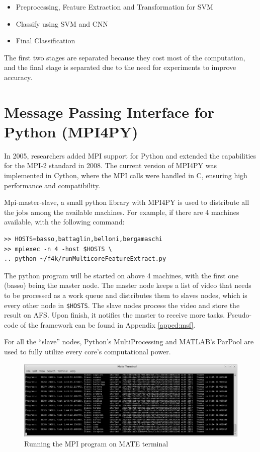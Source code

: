 \documentclass[bsc,frontabs,twoside,fullspacing,parskip,deptreport]{infthesis}
\begin{document}
\begin{itemize}
   \setlength{\parskip}{0pt}
   \item Preprocessing, Feature Extraction and Transformation for SVM
   \item Classify using SVM and CNN
   \item Final Classification
\end{itemize}
The first two stages are separated because they cost most of the computation, and the final stage is separated due to the need for experiments to improve accuracy.

\section{Message Passing Interface for Python (MPI4PY)}

In 2005, researchers added MPI support for Python\cite{MPI4PY} and extended the capabilities for the MPI-2 standard in 2008\cite{MPI4PY2}. The current version of MPI4PY\cite{MPI4PY3} was implemented in Cython, where the MPI calls were handled in C, ensuring high performance and compatibility.

Mpi-master-slave\cite{L5}, a small python library with MPI4PY is used to distribute all the jobs among the available machines. 
For example, if there are 4 machines available, with the following command: 
\lstset{basicstyle=\footnotesize\ttfamily,breaklines=true}
\begin{lstlisting}[frame=single]
>> HOSTS=basso,battaglin,belloni,bergamaschi
>> mpiexec -n 4 -host $HOSTS \
.. python ~/f4k/runMulticoreFeatureExtract.py
\end{lstlisting}
The python program will be started on above 4 machines, with the first one (basso) being the master node.
The master node keeps a list of video that needs to be processed as a work queue and distributes them to slaves nodes, which is every other node in {\tt \$HOSTS}. 
The slave nodes process the video and store the result on AFS. Upon finish, it notifies the master to receive more tasks. Pseudo-code of the framework can be found in Appendix \ref{apped:msf}.

For all the ``slave'' nodes, Python's MultiProcessing and MATLAB's ParPool are used to fully utilize every core's computational power.

\begin{figure}
    \centering
    \includegraphics[scale=0.30]{graph/sample_terminal.png}
    \caption{Running the MPI program on MATE terminal}
    \label{fig:mpi}
\end{figure}
\end{document}
